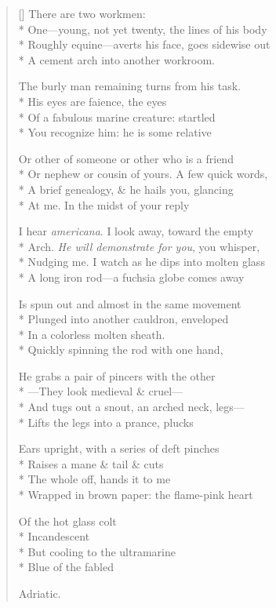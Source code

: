\label{ch:murano}
\settowidth{\versewidth}{Roughly equine—averts his face, goes sidewise out}
\begin{verse}[\versewidth]
There are two workmen:\\*
One---young, not yet twenty, the lines of his body\\*
Roughly equine---averts his face, goes sidewise out\\*
A cement arch into another workroom.

The burly man remaining turns from his task.\\*
His eyes are faience, the eyes\\*
Of a fabulous marine creature: startled\\*
You recognize him: he is some relative

Or other of someone or other who is a friend\\*
Or nephew or cousin of yours. A few quick words,\\*
A brief genealogy, \& he hails you, glancing\\*
At me. In the midst of your reply

I hear \textit{americana}. I look away, toward the empty\\*
Arch. \textit{He will demonstrate for you}, you whisper,\\*
Nudging me. I watch as he dips into molten glass\\*
A long iron rod---a fuchsia globe comes away

Is spun out and almost in the same movement\\*
Plunged into another cauldron, enveloped\\*
In a colorless molten sheath.\\*
Quickly spinning the rod with one hand,

He grabs a pair of pincers with the other\\*
---They look medieval \& cruel---\\*
And tugs out a snout, an arched neck, legs---\\*
Lifts the legs into a prance, plucks

Ears upright, with a series of deft pinches\\*
Raises a mane \& tail \& cuts\\*
The whole off, hands it to me\\*
Wrapped in brown paper: the flame-pink heart

Of the hot glass colt\\*
Incandescent\\*
But cooling to the ultramarine\\*
Blue of the fabled

Adriatic.
\end{verse}
